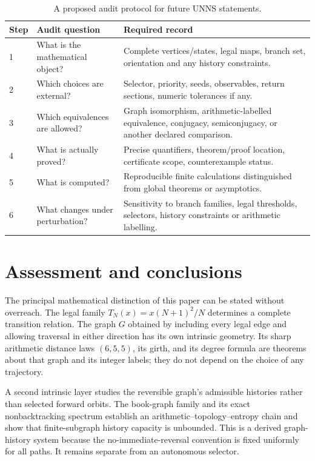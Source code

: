 \documentclass[11pt,a4paper]{article}
\theoremstyle{definition}\newtheorem{definition}[theorem]{Definition}
\begin{document}
\begin{table}[htbp]
\centering\small
\caption{A proposed audit protocol for future UNNS statements.}
\label{tab:audit}
\begin{tabularx}{\textwidth}{@{}p{11mm}p{39mm}X@{}}
\toprule
\textbf{Step} & \textbf{Audit question} & \textbf{Required record}\\
\midrule
1 & What is the mathematical object? & Complete vertices/states, legal maps, branch set, orientation and any history constraints.\\
2 & Which choices are external? & Selector, priority, seeds, observables, return sections, numeric tolerances if any.\\
3 & Which equivalences are allowed? & Graph isomorphism, arithmetic-labelled equivalence, conjugacy, semiconjugacy, or another declared comparison.\\
4 & What is actually proved? & Precise quantifiers, theorem/proof location, certificate scope, counterexample status.\\
5 & What is computed? & Reproducible finite calculations distinguished from global theorems or asymptotics.\\
6 & What changes under perturbation? & Sensitivity to branch families, legal thresholds, selectors, history constraints or arithmetic labelling.\\
\bottomrule
\end{tabularx}
\end{table}

\section{Assessment and conclusions}
\label{sec:conclusion}
The principal mathematical distinction of this paper can be stated without overreach. The legal family $T_N(x)=x(N+1)^2/N$ determines a complete transition relation. The graph $G$ obtained by including every legal edge and allowing traversal in either direction has its own intrinsic geometry. Its sharp arithmetic distance laws $(6,5,5)$, its girth, and its degree formula are theorems about that graph and its integer labels; they do not depend on the choice of any trajectory.

A second intrinsic layer studies the reversible graph's admissible histories rather than selected forward orbits. The book-graph family and its exact nonbacktracking spectrum establish an arithmetic--topology--entropy chain and show that finite-subgraph history capacity is unbounded. This is a derived graph-history system because the no-immediate-reversal convention is fixed uniformly for all paths. It remains separate from an autonomous selector.
\end{document}

